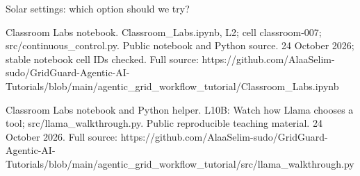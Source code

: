 \begin{frame}[t]{Solar settings: which option should we try?}
{Classroom Labs notebook. Classroom\_Labs.ipynb, L2; cell classroom-007; src/continuous\_control.py. Public notebook and Python source. 24 October 2026; stable notebook cell IDs checked.
Full source: https://github.c\allowbreak{}om/AlaaSelim-sud\allowbreak{}o/GridGuard-Agen\allowbreak{}tic-AI-Tutorials\allowbreak{}/blob/main/agent\allowbreak{}ic\_grid\_workflow\allowbreak{}\_tutorial/Classr\allowbreak{}oom\_Labs.ipynb

Classroom Labs notebook and Python helper. L10B: Watch how Llama chooses a tool; src/llama\_walkthrough.py. Public reproducible teaching material. 24 October 2026.
Full source: https://github.c\allowbreak{}om/AlaaSelim-sud\allowbreak{}o/GridGuard-Agen\allowbreak{}tic-AI-Tutorials\allowbreak{}/blob/main/agent\allowbreak{}ic\_grid\_workflow\allowbreak{}\_tutorial/src/ll\allowbreak{}ama\_walkthrough.\allowbreak{}py}
\end{frame}

